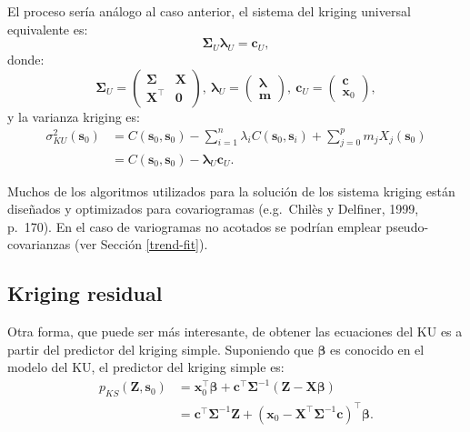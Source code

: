 \documentclass[
  spanish,
]{book}
\theoremstyle{break}
\theoremstyle{definition}
\theoremstyle{definition}
\theoremstyle{definition}
\theoremstyle{definition}
\theoremstyle{remark}
\begin{document}
El proceso sería análogo al caso anterior, el sistema del kriging universal equivalente es:
\[\boldsymbol{\Sigma}_{U} \boldsymbol{\lambda}_{U} = \mathbf{c}_{U},\]
donde:
\[\boldsymbol{\Sigma}_{U} =\left( 
\begin{array}{lc}
\boldsymbol{\Sigma} & \mathbf{X} \\
\mathbf{X^\top } & \mathbf{0}
\end{array}
\right) ,\ 
\boldsymbol{\lambda}_{U} =\left( \begin{array}{c}
\boldsymbol{\lambda} \\
\mathbf{m}
\end{array} \right) ,\ 
\mathbf{c}_{U} =\left( \begin{array}{c}
\mathbf{c} \\
\mathbf{x}_0
\end{array} \right),\]
y la varianza kriging es:
\[\begin{aligned}
\sigma_{KU}^{2} (\mathbf{s}_{0}) 
& = C(\mathbf{s}_{0},\mathbf{s}_{0}) - \sum\limits_{i=1}^{n}\lambda_{i}  C(\mathbf{s}_{0},\mathbf{s}_{i}) + \sum\limits_{j=0}^{p}m_{j} X_{j}(\mathbf{s}_{0}) \\
& = C(\mathbf{s}_{0}, \mathbf{s}_{0}) - \boldsymbol{\lambda}_{U} \mathbf{c}_{U}.
\end{aligned}\]

Muchos de los algoritmos utilizados para la solución de los sistema kriging están diseñados y optimizados para covariogramas (e.g.~Chilès y Delfiner, 1999, p.~170).
En el caso de variogramas no acotados se podrían emplear pseudo-covarianzas (ver Sección \ref{trend-fit}).

\hypertarget{kriging-residual}{%
\subsection{Kriging residual}\label{kriging-residual}}

Otra forma, que puede ser más interesante, de obtener las ecuaciones del KU es a partir del predictor del kriging simple.
Suponiendo que \(\boldsymbol{\beta}\) es conocido en el modelo del KU, el predictor del kriging simple es:
\[\begin{aligned}
p_{KS} (\mathbf{Z},\mathbf{s}_{0})
& = \mathbf{x}_0^{\top}\boldsymbol{\beta} + \mathbf{c}^{\top} \boldsymbol{\Sigma}^{-1} \left( \mathbf{Z} - \mathbf{X}\boldsymbol{\beta} \right) \\
& =\mathbf{c^\top }\boldsymbol{\Sigma}^{-1}
\mathbf{Z}+(\mathbf{x}_0-\mathbf{X^\top }\boldsymbol{\Sigma}^{-1} \mathbf{c})^\top \boldsymbol{\beta}.
\end{aligned}\]
\end{document}
